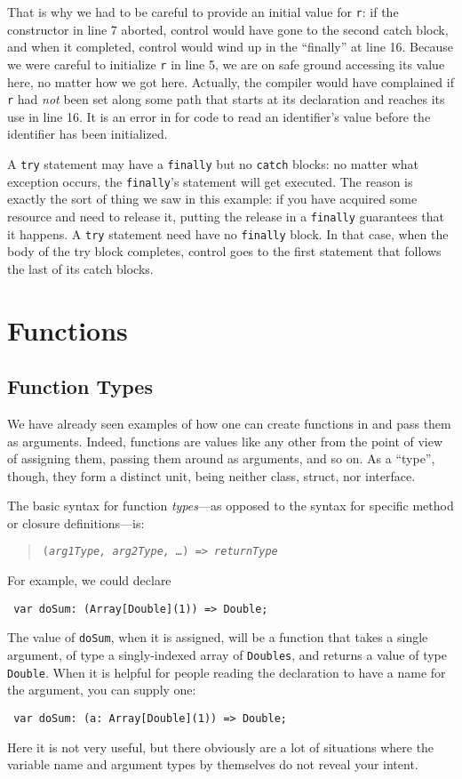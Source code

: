\begin{description}
That is why we had to be careful to provide an initial value for {\tt r}: if the
constructor in line 7 aborted, control would have gone to the second catch block,
and when it completed, control would wind up in the ``finally'' at line 16.
Because we were careful to initialize {\tt r} in line 5, we are on safe ground
accessing its value here, no matter how we got here.  Actually, the compiler
would have complained if {\tt r} had {\em not} been set along some path that
starts at its declaration and reaches its use in line 16.  It is an error in
\Xten{} for code to read an identifier's value before the identifier has been
initialized.
\end{description}

A {\tt try} statement may have a {\tt finally} but no {\tt catch} blocks: no
matter what exception occurs, the {\tt finally}'s statement will get executed. 
The reason is exactly the sort of thing we saw in this example: if you have
acquired some resource and need to release it, putting the release
in a {\tt finally} guarantees that it happens. A {\tt try} statement
need have no {\tt finally} block. In that case, when the body of the try block
completes, control goes to the first statement that follows the last of its
catch blocks.

\section{Functions}
\subsection{Function Types}
We have already seen examples of how one can create functions in \Xten{} and
pass them as arguments.  Indeed, functions are values like any other from the
point of view of assigning them, passing them around as arguments, and so on. 
As a ``type'', though, they form a distinct unit, being neither class, struct,
nor interface.

The basic syntax for function {\em types}---as opposed to
the syntax for specific method or closure definitions---is:
\begin{quote}
{\tt ({\em arg1Type, arg2Type, \ldots}) => {\em returnType}}
\end{quote}
For example, we could declare
\begin{verbatim}
 var doSum: (Array[Double](1)) => Double;
\end{verbatim}
The value of {\tt doSum}, when it is assigned, will be a function that
takes a single argument, of type a singly-indexed array of {\tt Doubles}, and
returns a value of type {\tt Double}.  When it is helpful for people reading the
declaration to have a name for the argument, you can supply one:
\begin{verbatim}
 var doSum: (a: Array[Double](1)) => Double;
\end{verbatim}
Here it is not very useful, but there obviously are a lot of situations where
the variable name and argument types by themselves do not reveal your intent.

